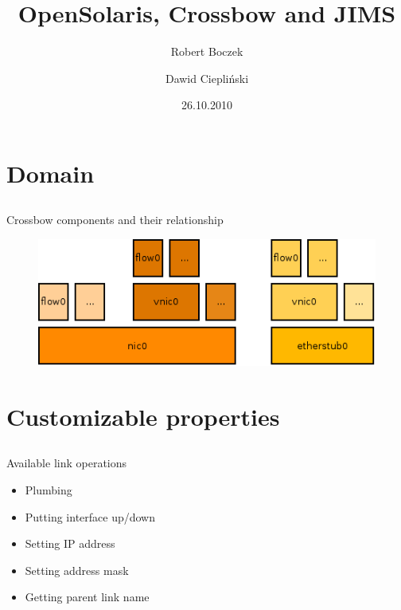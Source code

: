 \documentclass{beamer}
\title{OpenSolaris, Crossbow and JIMS}
\author{Robert Boczek \and Dawid Ciepliński}
\date{26.10.2010}
\begin{document}
\begin{frame}

	\titlepage

\end{frame}


\section{Domain}

	\subsection{}

		\begin{frame}{Crossbow components and their relationship}
		
			\begin{figure}[H]
				\includegraphics[width=\textwidth]{img/domain.png}
			\end{figure}
		
		\end{frame}


\section{Customizable properties}

	\subsection{}

		\begin{frame}{Available link operations}

			\begin{itemize}
				\item Plumbing
				\item Putting interface up/down
				\item Setting IP address
				\item Setting address mask
				\item Getting parent link name				
			\end{itemize}
		\end{frame}
\end{document}
